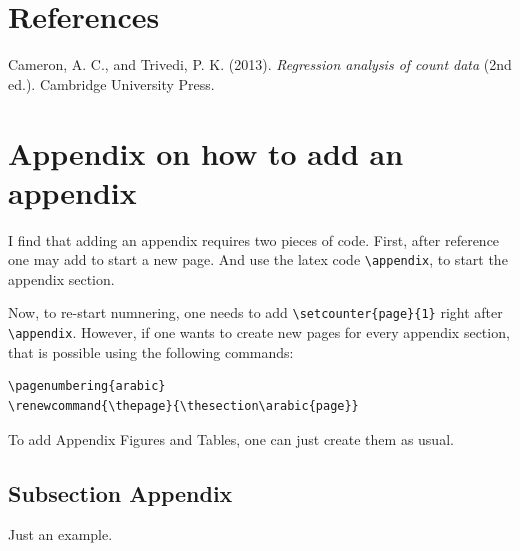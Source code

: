 \documentclass[
  12pt,
]{article}
\newlength{\cslhangindent}
\newenvironment{CSLReferences}[2] %
 {\begin{list}{}{%
  \setlength{\itemindent}{0pt}
  \setlength{\leftmargin}{0pt}
  \setlength{\parsep}{0pt}
  \ifodd #1
   \setlength{\leftmargin}{\cslhangindent}
   \setlength{\itemindent}{-1\cslhangindent}
  \fi
  \setlength{\itemsep}{#2\baselineskip}}}
 {\end{list}}
\begin{document}
\lipsum[1-4]

\section*{References}\label{references}

\label{refs}
\begin{CSLReferences}{1}{0}
Cameron, A. C., and Trivedi, P. K. (2013). \emph{Regression analysis of
count data} (2nd ed.). Cambridge University Press.

\end{CSLReferences}

\newpage{}

\appendix
{}
\renewcommand{\thepage}{\thesection\arabic{page}}

\section{Appendix on how to add an
appendix}\label{appendix-on-how-to-add-an-appendix}

I find that adding an appendix requires two pieces of code. First, after
reference one may add \texttt{} to start a new page. And use the latex
code \texttt{\textbackslash{}appendix}, to start the appendix section.

Now, to re-start numnering, one needs to add
\texttt{\textbackslash{}setcounter\{page\}\{1\}} right after
\texttt{\textbackslash{}appendix}. However, if one wants to create new
pages for every appendix section, that is possible using the following
commands:

\begin{verbatim}
\pagenumbering{arabic}
\renewcommand{\thepage}{\thesection\arabic{page}}
\end{verbatim}

To add Appendix Figures and Tables, one can just create them as usual.

\subsection{Subsection Appendix}\label{subsection-appendix}

Just an example.

\lipsum[1-4]
\end{document}
